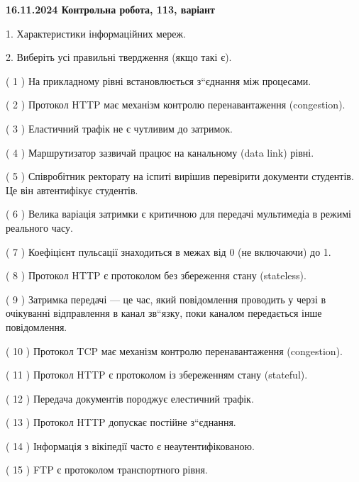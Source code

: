 \documentclass[12pt, ukrainian]{article}
\begin{document}
\vspace{4mm}
\newpage
\begin {large}

\textbf{16.11.2024 Контрольна робота, 113, варіант  }\par


{
1. Характеристики інформаційних мереж.



\vspace{5mm}
2. Виберіть усі правильні твердження (якщо такі є).\par
\vspace{2mm}

( 1 ) На прикладному рівні встановлюється з“єднання між процесами.

( 2 ) Протокол HTTP має механізм контролю перенавантаження (congestion).

( 3 ) Еластичний трафік не є чутливим до затримок.

( 4 ) Маршрутизатор зазвичай працює на канальному (data link) рівні.

( 5 ) Співробітник ректорату на іспиті вирішив перевірити документи студентів. Це він автентифікує студентів.

( 6 ) Велика варіація затримки є критичною для передачі мультимедіа в режимі реального часу.

( 7 ) Коефіцієнт пульсації знаходиться в межах від 0 (не включаючи) до 1.

( 8 ) Протокол  HTTP є протоколом без збереження стану (stateless).

( 9 ) Затримка передачі — це час, який повідомлення проводить у черзі в очікуванні відправлення в канал зв“язку, поки каналом передається інше повідомлення.

( 10 ) Протокол TCP має механізм контролю перенавантаження (congestion).

( 11 ) Протокол  HTTP є протоколом із збереженням стану (stateful).

( 12 ) Передача документів породжує елестичний трафік.

( 13 ) Протокол  HTTP допускає постійне з“єднання.

( 14 ) Інформація з вікіпедії часто є неаутентифікованою.

( 15 ) FTP є протоколом транспортного рівня.
}
\end {large}
\end{document}
